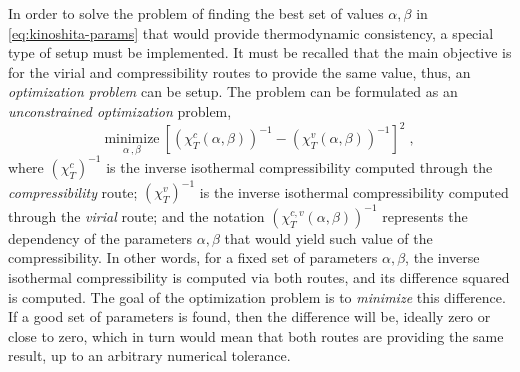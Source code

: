 In order to solve the problem of finding the best set of values \(\alpha, \beta\) in 
\autoref{eq:kinoshita-params} that would provide thermodynamic consistency, a special type 
of setup must be implemented. It must be recalled that the main objective is for the virial 
and compressibility routes to provide the same value, thus, an \emph{optimization problem} 
can be setup. The problem can be formulated as an \emph{unconstrained optimization} problem,
\begin{equation}
    \underset{\alpha \, , \beta}{\text{minimize}} \: {\left[
        {\left(\chi_{T}^{c} \left(\alpha, \beta\right) \right)}^{-1} - {\left(\chi_{T}^{v} \left(\alpha, \beta\right) \right)}^{-1} \right]}^2
    \; ,
    \label{eq:optimiziation-chi}
\end{equation}
where \({\left(\chi_{T}^{c}\right)}^{-1}\) is the inverse isothermal compressibility 
computed through the \emph{compressibility} route; \({\left(\chi_{T}^{v}\right)}^{-1}\) is 
the inverse isothermal compressibility computed through the \emph{virial} route; and the 
notation \({\left(\chi_{T}^{c, v} \left(\alpha, \beta\right) \right)}^{-1}\) represents the 
dependency of the parameters \(\alpha, \beta\) that would yield such value of the 
compressibility. In other words, for a fixed set of parameters \(\alpha, \beta\), the 
inverse isothermal compressibility is computed via both routes, and its difference squared 
is computed. The goal of the optimization problem is to \emph{minimize} this difference. If 
a good set of parameters is found, then the difference will be, ideally zero or close to 
zero, which in turn would mean that both routes are providing the same result, up to an 
arbitrary numerical tolerance.

